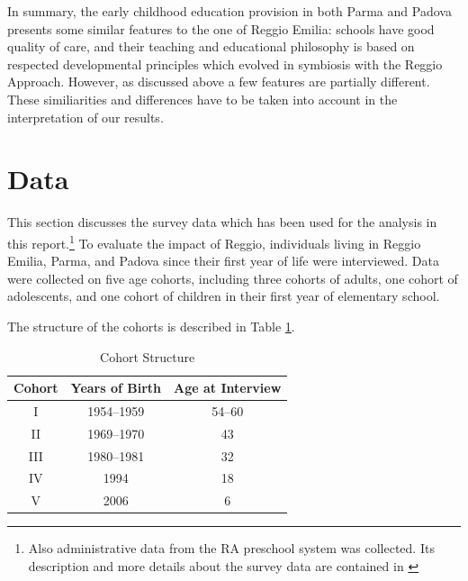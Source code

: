 \documentclass[12pt]{article}
\begin{document}
In summary, the early childhood education provision in both Parma and Padova presents some similar features to the one of Reggio Emilia: schools have good quality of care, and their teaching and educational philosophy is based on respected developmental principles which evolved in symbiosis with the Reggio Approach. However, as discussed above a few features are partially different. These similiarities and differences have to be taken into account in the interpretation of our results.


\section{Data}
\label{sec:data}

This section discusses the survey data which has been used for the analysis in this report.\footnote{Also administrative data from the RA preschool system was collected. Its description and more details about the survey data are contained in \citet{biroli2015evaluating}} To evaluate the impact of Reggio, individuals living in Reggio Emilia, Parma, and Padova since their first year of life were interviewed. Data were collected on five age cohorts, including three cohorts of adults, one cohort of adolescents, and one cohort of children in their first year of elementary school.

The structure of the cohorts is described in Table \ref{tab:cohorts}.

\begin{table}[ht]
\caption{Cohort Structure}
\label{tab:cohorts}
\begin{center}
\begin{tabular}{ccc}
\hline\hline
Cohort & Years of Birth & Age at Interview \\ \hline
I & 1954--1959 & 54--60 \\ 
II & 1969--1970 & 43 \\ 
III & 1980--1981 & 32 \\ 
IV & 1994 & 18 \\ 
V & 2006 & 6 \\ \hline
\end{tabular}
\end{center}
\end{table}

\end{document}
